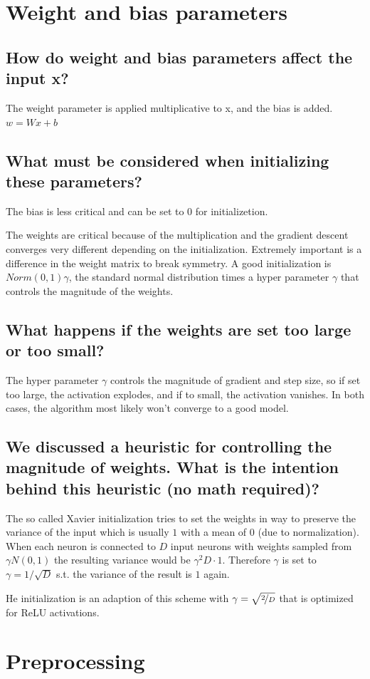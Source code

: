\section[Weight and bias]{Weight and bias parameters}
\subsection{How do weight and bias parameters affect the input x?}
The weight parameter is applied multiplicative to x, and the bias is added. $w = Wx+b$
\subsection{What must be considered when initializing these parameters?}
The bias is less critical and can be set to $0$ for initializetion.

The weights are critical because of the multiplication and the gradient descent converges very different depending on the initialization. Extremely important is a difference in the weight matrix to break symmetry. A good  initialization is $Norm(0,1)\gamma$, the standard normal distribution times a hyper parameter $\gamma$ that controls the magnitude of the weights.
\subsection{What happens if the weights are set too large or too small?}
The hyper parameter $\gamma$ controls the magnitude of gradient and step size, so if set too large, the activation explodes, and if to small, the activation vanishes. In both cases, the algorithm most likely won't converge to a good model. 
\subsection{We discussed a heuristic for controlling the magnitude of weights. What is the intention behind this heuristic (no math required)?}
The so called Xavier initialization tries to set the weights in way to preserve the variance of the input which is usually $1$ with a mean of $0$ (due to normalization). When each neuron is connected to $D$ input neurons with weights sampled from $\gamma N(0,1)$ the resulting variance would be $\gamma^2 D\cdot 1$. Therefore $\gamma$ is set to $\gamma= 1/\sqrt{D}$ s.t. the variance of the result is $1$ again. 

He initialization is an adaption of this scheme with $\gamma = \sqrt{\nicefrac 2 D}$ that is optimized for ReLU activations.
\section{Preprocessing}
